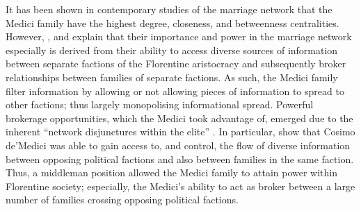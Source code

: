 \documentclass[11pt,fleqn]{article}
\begin{document}
It has been shown in contemporary studies of the marriage network that the Medici family have the highest degree, closeness, and betweenness centralities. However, \citet{Roover1963}, \citet{Padgett1994} and \citet{Goldthwaite2009} explain that their importance and power in the marriage network especially is derived from their ability to access diverse sources of information between separate factions of the Florentine aristocracy and subsequently broker relationships between families of separate factions. As such, the Medici family filter information by allowing or not allowing pieces of information to spread to other factions; thus largely monopolising informational spread. Powerful brokerage opportunities, which the Medici took advantage of, emerged due to the inherent ``network disjunctures within the elite'' \citep[p.~1259]{Padgett1993}. In particular, \citet{Padgett1993} show that Cosimo de'Medici was able to gain access to, and control, the flow of diverse information between opposing political factions and also between families in the same faction. Thus, a middleman position allowed the Medici family to attain power within Florentine society; especially, the Medici's ability to act as broker between a large number of families crossing opposing political factions.
\end{document}
